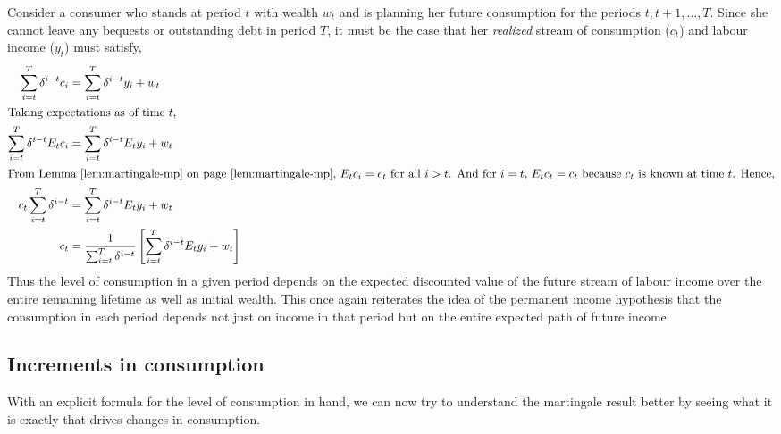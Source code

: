 \documentclass[12pt,reqno,openany]{amsbook}
\theoremstyle{plain}
\theoremstyle{definition}
\begin{document}
Consider a consumer who stands at period $t$ with wealth $w_t$ and is
planning her future consumption for the periods
$t,t+1,\ldots,T$. Since she cannot leave any bequests or outstanding
debt in period $T$, it must be the case that  her \emph{realized}
stream of consumption ($c_t$) and labour income ($y_t$) must satisfy,
\begin{align}
\sum_{i=t}^T \delta^{i-t} c_i &= \sum_{i=t}^T \delta^{i-t} y_i +
w_t\\
\intertext{Taking expectations as of time $t$,}
\sum_{i=t}^T \delta^{i-t} E_t c_i &= \sum_{i=t}^T \delta^{i-t} E_t y_i +
w_t\\
\intertext{From Lemma~\ref{lem:martingale-mp} on
  page~\pageref{lem:martingale-mp}, $E_tc_i=c_t$ for all
$i>t$. And for $i=t$, $E_tc_t=c_t$ because $c_t$ is known at time
$t$. Hence,}
c_t\sum_{i=t}^T \delta^{i-t}  &= \sum_{i=t}^T \delta^{i-t} E_t y_i +
w_t\label{eq:level-c-pih}\\
c_t&=\frac{1}{\sum_{i=t}^T \delta^{i-t} }\left[ \sum_{i=t}^T \delta^{i-t} E_t y_i +
w_t\right]
\end{align}
Thus the level of consumption in a given period depends on the
expected discounted value of the future stream of labour income over
the entire remaining lifetime as well as initial wealth. This once
again reiterates the idea of the permanent income hypothesis that the
consumption in each period depends not just on income in that period
but on the entire expected path of future income.
\subsection{Increments in consumption}
With an explicit formula for the level of consumption in hand, we can
now try to understand the martingale result better by seeing what it
is exactly that drives changes in consumption.
\end{document}
